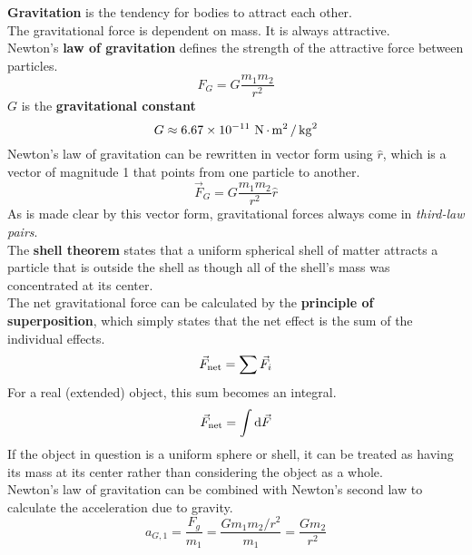 \documentclass[../AP_Physics_C]{subfiles}
\begin{document}
	\textbf{Gravitation} is the tendency for bodies to attract each other. \\
	The gravitational force is dependent on mass. It is always attractive. \\
	Newton's \textbf{law of gravitation} defines the strength of the attractive force between particles.
	\[F_G = G\frac{m_1m_2}{r^2}\]
	$G$ is the \textbf{gravitational constant}
	\[G \approx 6.67 \times 10^{-11} \,\operatorname{N}\cdot\operatorname{m}^2/\operatorname{kg}^2\]
	Newton's law of gravitation can be rewritten in vector form using $\hat{r}$, which is a vector of magnitude 1 that points from one particle to another.
	\[\vec{F}_G = G\frac{m_1m_2}{r^2}\hat{r}\]
	As is made clear by this vector form, gravitational forces always come in \emph{third-law pairs}. \\
	The \textbf{shell theorem} states that a uniform spherical shell of matter attracts a particle that is outside the shell as though all of the shell's mass was concentrated at its center. \\
	The net gravitational force can be calculated by the \textbf{principle of superposition}, which simply states that the net effect is the sum of the individual effects.
	\[\vec{F}_{\operatorname{net}} = \sum \vec{F}_i\]
	For a real (extended) object, this sum becomes an integral.
	\[\vec{F}_{\operatorname{net}} = \int\mathrm{d}\vec{F}\]
	If the object in question is a uniform sphere or shell, it can be treated as having its mass at its center rather than considering the object as a whole. \\
	Newton's law of gravitation can be combined with Newton's second law to calculate the acceleration due to gravity.
	\[a_{G,1} = \frac{F_g}{m_1} = \frac{Gm_1m_2/r^2}{m_1} = \frac{Gm_2}{r^2}\]
\end{document}
